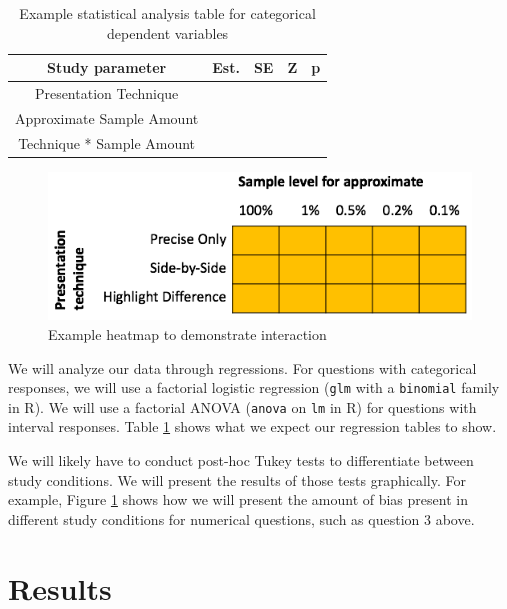 \documentclass[10pt,journal,compsoc]{IEEEtran}
\begin{document}
\begin{table}[!t]
\renewcommand{\arraystretch}{1.3}
\caption{Example statistical analysis table for categorical dependent variables}
\label{table_example}
\centering
\begin{tabular}{|c||c|c|c|c|}
\hline
Study parameter & Est. & SE & Z & p\\
\hline
\hline
Presentation Technique & & & & \\
\hline
Approximate Sample Amount & & & & \\
\hline
Technique * Sample Amount & & & & \\
\hline
\end{tabular}
\end{table}

\begin{figure}[!t]
  \centering
  \includegraphics[width=\columnwidth]{blankheatmap.png}
  \caption{Example heatmap to demonstrate interaction}
  \label{fig:blank_heatmap}
\end{figure}

We will analyze our data through regressions.
For questions with categorical responses, we will use a factorial logistic regression (\texttt{glm} with a \texttt{binomial} family in R).
We will use a factorial ANOVA (\texttt{anova} on \texttt{lm} in R) for questions with interval responses.
Table \ref{table_example} shows what we expect our regression tables to show.

We will likely have to conduct post-hoc Tukey tests to differentiate between study conditions.
We will present the results of those tests graphically.
For example, Figure \ref{fig:blank_heatmap} shows how we will present the amount of bias present in different study conditions for numerical questions, such as question 3 above.

\section{Results}\label{sec:results}
\end{document}
